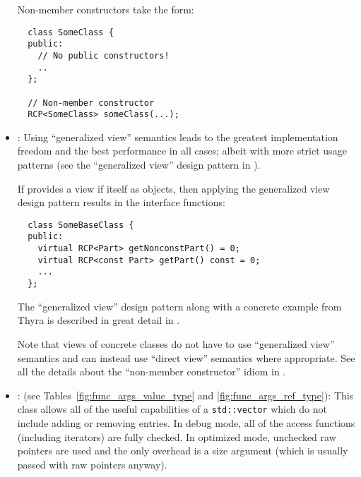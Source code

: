 \begin{itemize}
Non-member constructors take the form:

{\small\begin{verbatim}
  class SomeClass {
  public:
    // No public constructors!
    ..
  };

  // Non-member constructor
  RCP<SomeClass> someClass(...);
\end{verbatim}}


{}\item\GCGGeneralizedViews: Using ``generalized view'' semantics
leads to the greatest implementation freedom and the best performance
in all cases; albeit with more strict usage patterns (see the
``generalized view'' design pattern in
{}\cite{TeuchosMemoryManagementGuide}).

If {} provides a view if itself as {}
objects, then applying the generalized view design pattern results in
the interface functions:

{\small\begin{verbatim}
  class SomeBaseClass {
  public:
    virtual RCP<Part> getNonconstPart() = 0;
    virtual RCP<const Part> getPart() const = 0;
    ...
  };
\end{verbatim}}

The ``generalized view'' design pattern along with a concrete example
from Thyra is described in great detail in
{}\cite{TeuchosMemoryManagementGuide}.

Note that views of concrete classes do not have to use ``generalized
view'' semantics and can instead use ``direct view'' semantics where
appropriate.  See all the details about the ``non-member constructor''
idiom in {}\cite{TeuchosMemoryManagementGuide}.


{}\item\GCGTeuchosArrayView: (see Tables~\ref{fig:func_args_value_type} and
{}\ref{fig:func_args_ref_type}): This class allows all of the useful
capabilities of a {}\texttt{std::vector} which do not include adding or
removing entries.  In debug mode, all of the access functions (including
iterators) are fully checked.  In optimized mode, unchecked raw pointers are
used and the only overhead is a size argument (which is usually passed with
raw pointers anyway).



\end{itemize}
